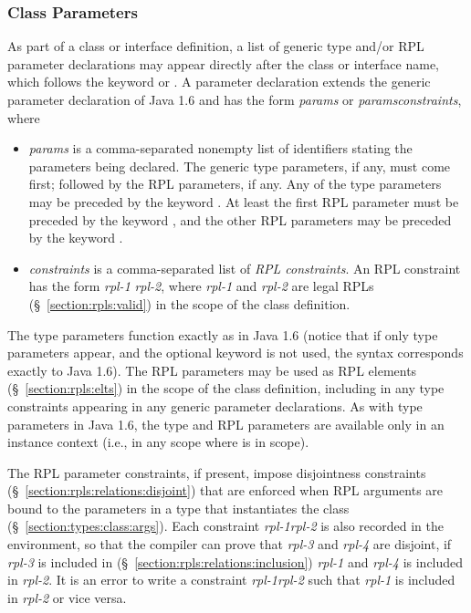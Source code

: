 \subsubsection{Class Parameters}
\label{section:class-def:params:class}

As part of a class or interface definition, a list of generic type
and/or RPL parameter declarations may appear directly after the class
or interface name, which follows the keyword  or
.  A parameter declaration extends the generic
parameter declaration of Java 1.6 and has the form
\kwd{<}\emph{params}\kwd{>} or
\kwd{<}\emph{params}\kwd{|}\emph{constraints}\kwd{>}, where
\begin{itemize}
\item \emph{params} is a comma-separated nonempty list of identifiers
  stating the parameters being declared.  The generic type parameters,
  if any, must come first; followed by the RPL parameters, if any.
  Any of the type parameters may be preceded by the keyword
  .  At least the first RPL parameter must be preceded by
  the keyword , and the other RPL parameters may be
  preceded by the keyword .
\item \emph{constraints} is a comma-separated list of \emph{RPL
  constraints}.  An RPL constraint has the form \emph{rpl-1} \kwd{\#}
  \emph{rpl-2}, where \emph{rpl-1} and \emph{rpl-2} are legal RPLs
  (\S~\ref{section:rpls:valid}) in the scope of the class definition.
\end{itemize}
The type parameters function exactly as in Java 1.6 (notice that if
only type parameters appear, and the optional  keyword is
not used, the syntax corresponds exactly to Java 1.6).  The RPL
parameters may be used as RPL elements (\S~\ref{section:rpls:elts}) in
the scope of the class definition, including in any type constraints
appearing in any generic parameter declarations.  As with type
parameters in Java 1.6, the type and RPL parameters are available only
in an instance context (i.e., in any scope where  is in
scope).

The RPL parameter constraints, if present, impose disjointness
constraints (\S~\ref{section:rpls:relations:disjoint}) that are
enforced when RPL arguments are bound to the parameters in a type that
instantiates the class (\S~\ref{section:types:class:args}).  Each
constraint \emph{rpl-1}\kwd{ \# }\emph{rpl-2} is also recorded in the
environment, so that the compiler can prove that \emph{rpl-3} and
\emph{rpl-4} are disjoint, if \emph{rpl-3} is included in
(\S~\ref{section:rpls:relations:inclusion}) \emph{rpl-1} and
\emph{rpl-4} is included in \emph{rpl-2}.  It is an error to write a
constraint \emph{rpl-1}\kwd{ \# }\emph{rpl-2} such that \emph{rpl-1}
is included in \emph{rpl-2} or vice versa.

